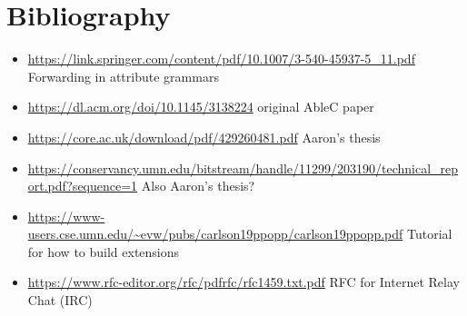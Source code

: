 \documentclass[main.tex]{subfiles}
\begin{document}
    \section*{Bibliography}
	\begin{itemize}
	\item \url{https://link.springer.com/content/pdf/10.1007/3-540-45937-5_11.pdf} Forwarding in attribute grammars
	\item \url{https://dl.acm.org/doi/10.1145/3138224} original AbleC paper
	\item \url{https://core.ac.uk/download/pdf/429260481.pdf} Aaron's thesis
	\item \url{https://conservancy.umn.edu/bitstream/handle/11299/203190/technical_report.pdf?sequence=1} Also Aaron's thesis?
	\item \url{https://www-users.cse.umn.edu/~evw/pubs/carlson19ppopp/carlson19ppopp.pdf} Tutorial for how to build extensions
	\item \url{https://www.rfc-editor.org/rfc/pdfrfc/rfc1459.txt.pdf} RFC for Internet Relay Chat (IRC)
	\end{itemize}
\end{document}
